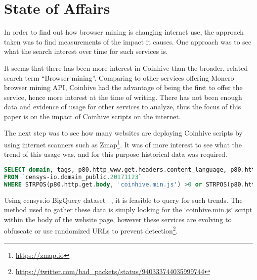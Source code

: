 \section{State of Affairs}
In order to find out how browser mining is changing internet use, the approach taken was to find measurements of the impact it causes. One approach was to see what the search interest over time for such services is. 

\vspace*{-1mm}
\begin{center}
	\caption{Google Trend - Search interest over last 12 months}
\end{center}
\vspace*{-1mm}

It seems that there has been more interest in Coinhive than the broader, related search term ``Browser mining''. Comparing to other services offering Monero browser mining API, Coinhive had the advantage of being the first to offer the service, hence more interest at the time of writing. There has not been enough data and evidence of usage for other services to analyze, thus the focus of this paper is on the impact of Coinhive scripts on the internet. 

The next step was to see how many websites are deploying Coinhive scripts by using internet scanners such as Zmap\footnote{\url{https://zmap.io}}. It was of more interest to see what the trend of this usage was, and for this purpose historical data was required. 
\vspace*{-2mm}
\begin{lstlisting}[caption={BigQuery SQL query to find websites using coinhive miner script using censys.io datasets},label={lst:bigquery},language=sql]
SELECT domain, tags, p80.http_www.get.headers.content_language, p80.http_www.get.headers.server, p80.http.get.headers.x_powered_by, p80.http.get.title , p80.http_www.get.body as wwwbody, p80.http.get.body as plainbody
FROM `censys-io.domain_public.20171123`
WHERE STRPOS(p80.http.get.body, 'coinhive.min.js') >0 or STRPOS(p80.http_www.get.body, 'coinhive.min.js') >0)
\end{lstlisting}
\vspace*{-4mm}

Using censys.io BigQuery dataset ~\cite{censys15}, it is feasible to query for such trends. The method used to gather these data is simply looking for the `coinhive.min.js` script within the body of the website page, however these services are evolving to obfuscate or use randomized URLs to prevent detection\footnote{\url{https://twitter.com/bad_packets/status/940333744035999744}}.

